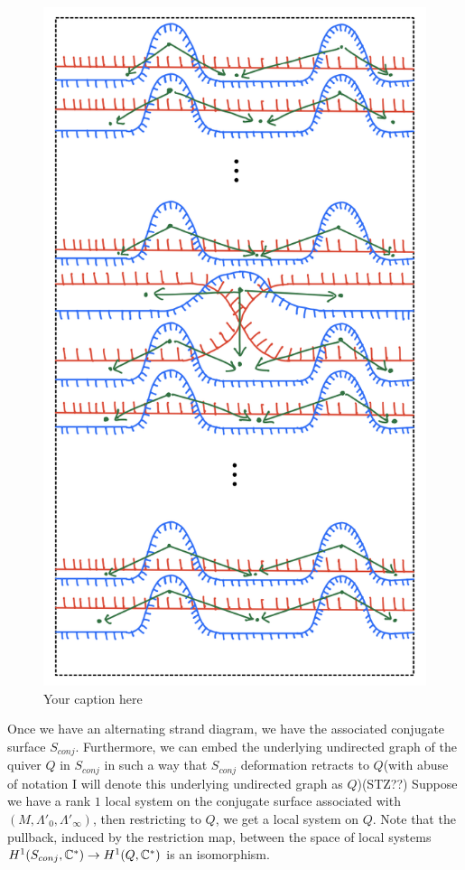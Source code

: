 \begin{figure}[H] 
    \centering
    \includegraphics[scale = 0.95]{diagrams/local_systems_on_as_diagrams/1-2.png} 
    \caption{Your caption here}
    \label{fig:your-label}
\end{figure}

Once we have an alternating strand diagram, we have the associated conjugate surface $S_{conj}$. Furthermore, we can embed the underlying undirected graph of the quiver $Q$ in $S_{conj}$ in such a way that $S_{conj}$ deformation retracts to $Q$(with abuse of notation I will denote this underlying undirected graph as $Q$)(STZ??)
Suppose we have a rank $1$ local system on the conjugate surface associated with $(M, \Lambda'_0, \Lambda'_\infty)$, then restricting to $Q$, we get a local system on $Q$. Note that the pullback, induced by the restriction map, between the space of local systems $H^1(S_{conj}, \mathbb{C}^*) \rightarrow  H^1(Q,\mathbb{C}^*)$ is an isomorphism.

